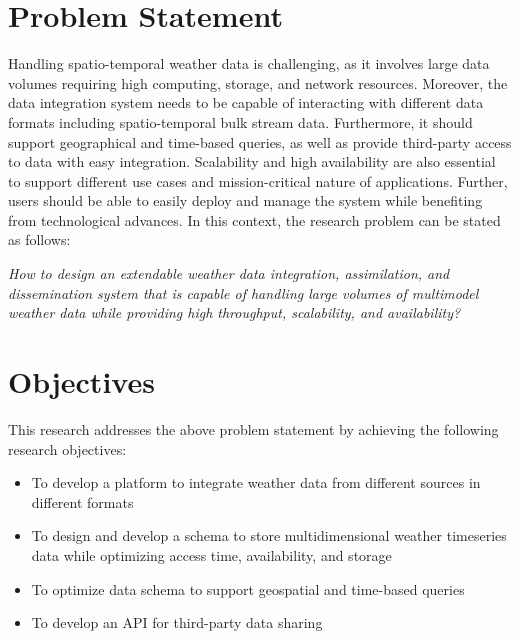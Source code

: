 \section{Problem Statement}
Handling spatio-temporal weather data is challenging, as it involves large data volumes requiring high computing, storage, and network resources. Moreover, the data integration system needs to be capable of interacting with different data formats including spatio-temporal bulk stream data. Furthermore, it should support geographical and time-based queries, as well as provide third-party access to data with easy integration. Scalability and high availability are also essential to support different use cases and mission-critical nature of applications.
Further, users should be able to easily deploy and manage the system while benefiting from technological advances. %
In this context, the research problem can be stated as follows:

\emph{How to design an extendable weather data integration, assimilation, and dissemination system that is capable of handling large volumes of multimodel weather data while providing high throughput, scalability, and availability?}

\section{Objectives}
This research addresses the above problem statement by achieving the following research objectives:
\begin{itemize}
    \item To develop a platform to integrate weather data from different sources in different formats
    \item To design and develop a schema to store multidimensional weather timeseries data while optimizing access time, availability, and storage
    \item To optimize data schema to support geospatial and time-based queries
    \item To develop an API for third-party data sharing
\end{itemize}
